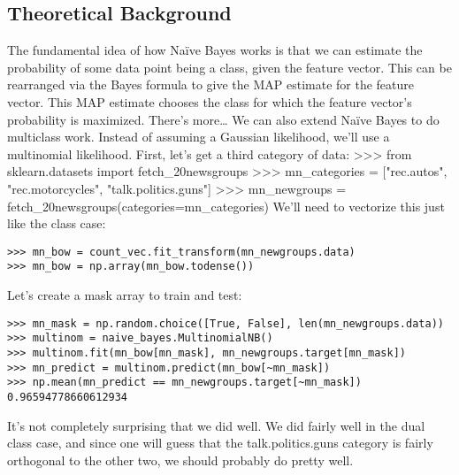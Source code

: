 \subsection{Theoretical Background}
The fundamental idea of how Naïve Bayes works is that we can estimate the probability of
some data point being a class, given the feature vector.
This can be rearranged via the Bayes formula to give the MAP estimate for the feature vector.
This MAP estimate chooses the class for which the feature vector's probability is maximized.
There's more…
We can also extend Naïve Bayes to do multiclass work. Instead of assuming a Gaussian
likelihood, we'll use a multinomial likelihood.
First, let's get a third category of data:
>>> from sklearn.datasets import fetch_20newsgroups
>>> mn_categories = ["rec.autos", "rec.motorcycles",
"talk.politics.guns"]
>>> mn_newgroups = fetch_20newsgroups(categories=mn_categories)
We'll need to vectorize this just like the class case:
\begin{framed}
\begin{verbatim}
>>> mn_bow = count_vec.fit_transform(mn_newgroups.data)
>>> mn_bow = np.array(mn_bow.todense())
\end{verbatim}
\end{framed}
Let's create a mask array to train and test:
\begin{framed}
\begin{verbatim}
>>> mn_mask = np.random.choice([True, False], len(mn_newgroups.data))
>>> multinom = naive_bayes.MultinomialNB()
>>> multinom.fit(mn_bow[mn_mask], mn_newgroups.target[mn_mask])
>>> mn_predict = multinom.predict(mn_bow[~mn_mask])
>>> np.mean(mn_predict == mn_newgroups.target[~mn_mask])
0.96594778660612934
\end{verbatim}
\end{framed}
It's not completely surprising that we did well. We did fairly well in the dual class case, and
since one will guess that the talk.politics.guns category is fairly orthogonal to the
other two, we should probably do pretty well.
